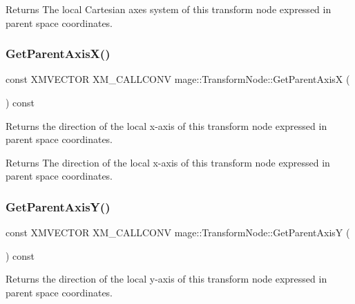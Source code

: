 \begin{DoxyReturn}{Returns}
The local Cartesian axes system of this transform node expressed in parent space coordinates. 
\end{DoxyReturn}
\hypertarget{classmage_1_1_transform_node_ac48562fc57379dd710494307f0c8f6d0}{}\label{classmage_1_1_transform_node_ac48562fc57379dd710494307f0c8f6d0} 
\subsubsection{\texorpdfstring{Get\+Parent\+Axis\+X()}{GetParentAxisX()}}
{\footnotesize\ttfamily const X\+M\+V\+E\+C\+T\+OR X\+M\+\_\+\+C\+A\+L\+L\+C\+O\+NV mage\+::\+Transform\+Node\+::\+Get\+Parent\+AxisX (\begin{DoxyParamCaption}{ }\end{DoxyParamCaption}) const\hspace{0.3cm}{\ttfamily [noexcept]}}

Returns the direction of the local x-\/axis of this transform node expressed in parent space coordinates.

\begin{DoxyReturn}{Returns}
The direction of the local x-\/axis of this transform node expressed in parent space coordinates. 
\end{DoxyReturn}
\hypertarget{classmage_1_1_transform_node_a992a00daf214e818cc2762b638ae9130}{}\label{classmage_1_1_transform_node_a992a00daf214e818cc2762b638ae9130} 
\subsubsection{\texorpdfstring{Get\+Parent\+Axis\+Y()}{GetParentAxisY()}}
{\footnotesize\ttfamily const X\+M\+V\+E\+C\+T\+OR X\+M\+\_\+\+C\+A\+L\+L\+C\+O\+NV mage\+::\+Transform\+Node\+::\+Get\+Parent\+AxisY (\begin{DoxyParamCaption}{ }\end{DoxyParamCaption}) const\hspace{0.3cm}{\ttfamily [noexcept]}}

Returns the direction of the local y-\/axis of this transform node expressed in parent space coordinates.

